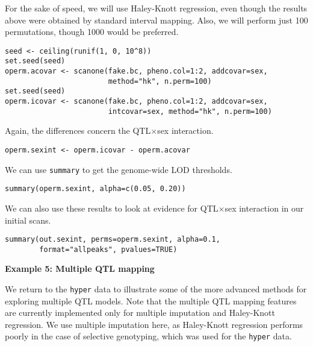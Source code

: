 \documentclass[10pt,letterpaper]{article}
\newcommand{\usercolor}{\color [named]{BlueViolet}}
\begin{document}
\begin{enumerate}
  For the sake of speed, we will use Haley-Knott regression, even
  though the results above were obtained by standard interval
  mapping. Also, we will perform just 100 permutations, though 1000
  would be preferred.

\usercolor
\verb|seed <- ceiling(runif(1, 0, 10^8))| \\
\verb|set.seed(seed)| \\
\verb|operm.acovar <- scanone(fake.bc, pheno.col=1:2, addcovar=sex,| \\
\verb|                        method="hk", n.perm=100)| \\
\verb|set.seed(seed)| \\
\verb|operm.icovar <- scanone(fake.bc, pheno.col=1:2, addcovar=sex,| \\
\verb|                        intcovar=sex, method="hk", n.perm=100)|
\normalcolor

Again, the differences concern the QTL$\times$sex interaction.

\usercolor
\verb|operm.sexint <- operm.icovar - operm.acovar|
\normalcolor

We can use \verb-summary- to get the genome-wide LOD thresholds.

\usercolor
\verb|summary(operm.sexint, alpha=c(0.05, 0.20))|
\normalcolor

We can also use these results to look at evidence for QTL$\times$sex
interaction in our initial scans.

\usercolor
\verb|summary(out.sexint, perms=operm.sexint, alpha=0.1,| \\
\verb|        format="allpeaks", pvalues=TRUE)|
\normalcolor


\end{enumerate}


\newpage
\noindent \textbf{Example 5: Multiple QTL mapping} \vspace{6pt}
\nopagebreak

\label{example5}

We return to the \verb-hyper- data to illustrate some of the more
advanced methods for exploring multiple QTL models.  Note that the
multiple QTL mapping features are currently implemented only for
multiple imputation and Haley-Knott regression.  We use multiple
imputation here, as Haley-Knott regression performs poorly in the case
of selective genotyping, which was used for the \verb-hyper- data.
\end{document}
